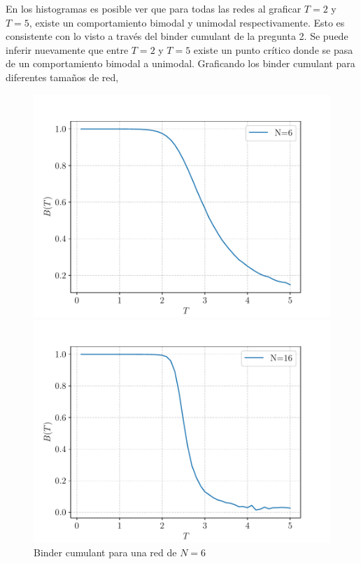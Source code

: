 \documentclass[11pt,a4paper]{article}
\begin{document}
En los histogramas es posible ver que para todas las redes al graficar $T = 2$ y $T = 5$, existe un comportamiento bimodal y unimodal respectivamente. 
Esto es consistente con lo visto a través del binder cumulant de la pregunta 2. Se puede inferir nuevamente que entre $T = 2$ y $T = 5$ existe un punto crítico donde se pasa de un comportamiento bimodal a unimodal.
Graficando los binder cumulant para diferentes tamaños de red,
\begin{figure}[H]
    \centering
    \begin{minipage}{0.45\textwidth}
        \centering
        \includegraphics[width=\textwidth]{p4/N6_binder.pdf}
        \caption{Binder cumulant para una red de $N = 6$}
        \label{fig:p4_5}
    \end{minipage}
    \hfill
    \begin{minipage}{0.45\textwidth}
        \centering
        \includegraphics[width=\textwidth]{p4/N16_binder.pdf}

\end{minipage}
\end{figure}
\end{document}
